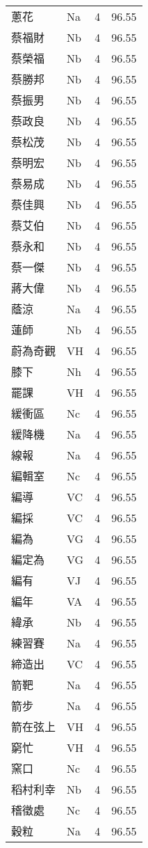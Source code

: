 \documentclass[twocolumn]{book}
\begin{document}
\begin{supertabular}{llrr}
蔥花 & Na & 4 &  96.55\\
蔡福財 & Nb & 4 &  96.55\\
蔡榮福 & Nb & 4 &  96.55\\
蔡勝邦 & Nb & 4 &  96.55\\
蔡振男 & Nb & 4 &  96.55\\
蔡政良 & Nb & 4 &  96.55\\
蔡松茂 & Nb & 4 &  96.55\\
蔡明宏 & Nb & 4 &  96.55\\
蔡易成 & Nb & 4 &  96.55\\
蔡佳興 & Nb & 4 &  96.55\\
蔡艾伯 & Nb & 4 &  96.55\\
蔡永和 & Nb & 4 &  96.55\\
蔡一傑 & Nb & 4 &  96.55\\
蔣大偉 & Nb & 4 &  96.55\\
蔭涼 & Na & 4 &  96.55\\
蓮師 & Nb & 4 &  96.55\\
蔚為奇觀 & VH & 4 &  96.55\\
膝下 & Nh & 4 &  96.55\\
罷課 & VH & 4 &  96.55\\
緩衝區 & Nc & 4 &  96.55\\
緩降機 & Na & 4 &  96.55\\
線報 & Na & 4 &  96.55\\
編輯室 & Nc & 4 &  96.55\\
編導 & VC & 4 &  96.55\\
編採 & VC & 4 &  96.55\\
編為 & VG & 4 &  96.55\\
編定為 & VG & 4 &  96.55\\
編有 & VJ & 4 &  96.55\\
編年 & VA & 4 &  96.55\\
緯承 & Nb & 4 &  96.55\\
練習賽 & Na & 4 &  96.55\\
締造出 & VC & 4 &  96.55\\
箭靶 & Na & 4 &  96.55\\
箭步 & Na & 4 &  96.55\\
箭在弦上 & VH & 4 &  96.55\\
窮忙 & VH & 4 &  96.55\\
窯口 & Nc & 4 &  96.55\\
稻村利幸 & Nb & 4 &  96.55\\
稽徵處 & Nc & 4 &  96.55\\
穀粒 & Na & 4 &  96.55\\

\end{supertabular}
\end{document}
